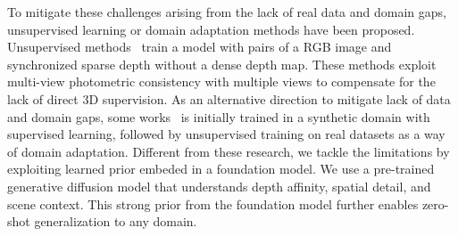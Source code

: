 To mitigate these challenges arising from the lack of real data and domain gaps, unsupervised learning or domain adaptation methods have been proposed. 
Unsupervised methods~\cite{wong2021unsupervised, ma2018self, wong2020void} train a model 
with pairs of a RGB image and synchronized sparse depth without a dense depth map.
These methods exploit multi-view 
photometric consistency with multiple views to compensate for the lack of direct 3D supervision. 
As an alternative direction to mitigate lack of data and domain gaps, some works~\cite{wong2021scaffnet, lopezrodriguez2020project} is initially trained in a synthetic domain with supervised learning, followed by unsupervised training on real datasets as a way of
domain adaptation.
Different from these research, we tackle
the limitations by exploiting learned prior embeded in a foundation model. 
We use a pre-trained generative diffusion model that understands depth affinity, spatial detail, and scene context.
This strong prior from the foundation model further enables zero-shot generalization to any domain.

